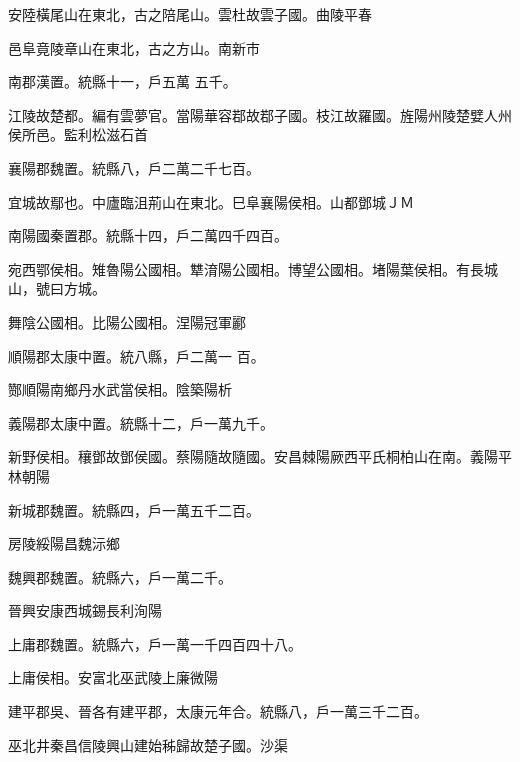 \begin{pinyinscope}
 安陸橫尾山在東北，古之陪尾山。雲杜故雲子國。曲陵平春



 邑阜竟陵章山在東北，古之方山。南新市



 南郡漢置。統縣十一，戶五萬
 五千。



 江陵故楚都。編有雲夢官。當陽華容鄀故鄀子國。枝江故羅國。旌陽州陵楚嬖人州侯所邑。監利松滋石首



 襄陽郡魏置。統縣八，戶二萬二千七百。



 宜城故鄢也。中廬臨沮荊山在東北。巳阜襄陽侯相。山都鄧城ＪＭ



 南陽國秦置郡。統縣十四，戶二萬四千四百。



 宛西鄂侯相。雉魯陽公國相。犨淯陽公國相。博望公國相。堵陽葉侯相。有長城山，號曰方城。



 舞陰公國相。比陽公國相。涅陽冠軍酈



 順陽郡太康中置。統八縣，戶二萬一
 百。



 酂順陽南鄉丹水武當侯相。陰築陽析



 義陽郡太康中置。統縣十二，戶一萬九千。



 新野侯相。穰鄧故鄧侯國。蔡陽隨故隨國。安昌棘陽厥西平氏桐柏山在南。義陽平林朝陽



 新城郡魏置。統縣四，戶一萬五千二百。



 房陵綏陽昌魏沶鄉



 魏興郡魏置。統縣六，戶一萬二千。



 晉興安康西城錫長利洵陽



 上庸郡魏置。統縣六，戶一萬一千四百四十八。



 上庸侯相。安富北巫武陵上廉微陽



 建平郡吳、晉各有建平郡，太康元年合。統縣八，戶一萬三千二百。



 巫北井秦昌信陵興山建始秭歸故楚子國。沙渠




\end{pinyinscope}
